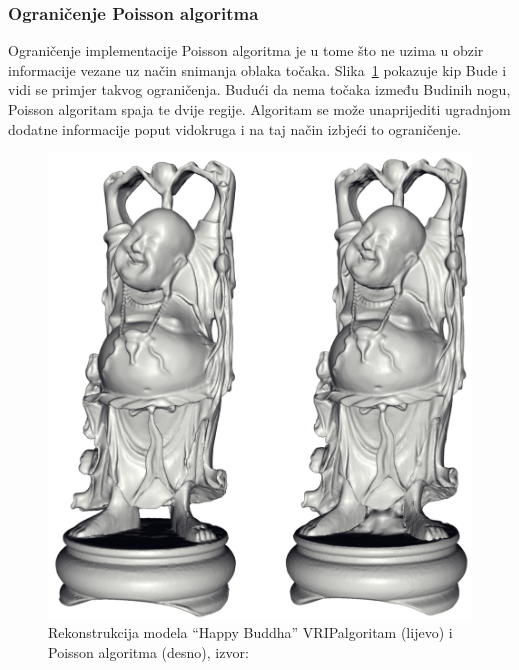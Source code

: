 
\subsubsection{Ograničenje Poisson algoritma} %
\label{ssub:Ograničenje Poisson algoritma}

Ograničenje implementacije Poisson algoritma je u tome što ne uzima u
obzir informacije vezane uz način snimanja oblaka točaka.
Slika~\ref{fig:poisson-buddha.png} pokazuje kip Bude i vidi se primjer takvog
ograničenja. Budući da nema točaka između Budinih nogu, Poisson
algoritam spaja te dvije regije. Algoritam se može unaprijediti
ugradnjom dodatne informacije poput vidokruga i na taj način izbjeći to
ograničenje.


\begin{figure}[h]
\centering
\includegraphics[scale=0.20]{figures/poisson-buddha.png}
\caption[]{Rekonstrukcija modela ``Happy Buddha'' 
VRIP\footnotemark[2] algoritam (lijevo) i Poisson algoritma (desno),
izvor:~\cite{Kazhdan:2006}}
\label{fig:poisson-buddha.png}
\end{figure}


